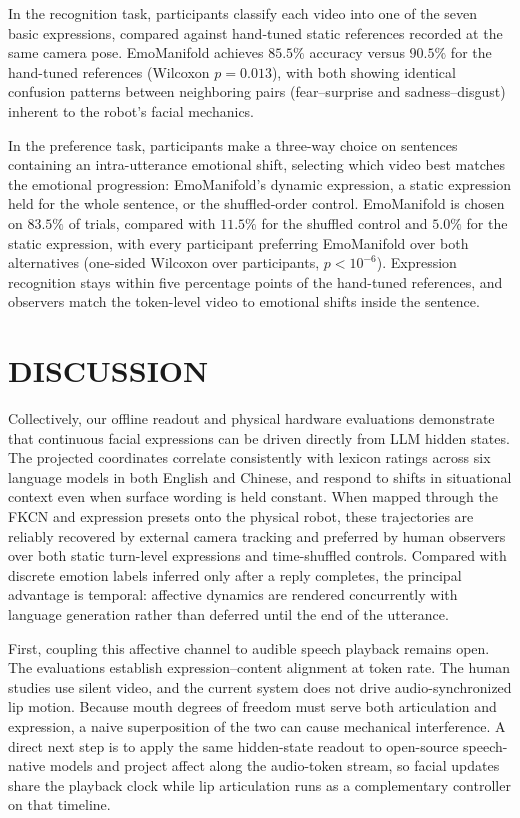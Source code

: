 \documentclass[letterpaper, 10 pt, conference]{ieeeconf/ieeeconf}
\begin{document}
In the recognition task, participants classify each video into one of the seven basic expressions, compared against hand-tuned static references recorded at the same camera pose. EmoManifold achieves $85.5\%$ accuracy versus $90.5\%$ for the hand-tuned references (Wilcoxon $p{=}0.013$), with both showing identical confusion patterns between neighboring pairs (fear--surprise and sadness--disgust) inherent to the robot's facial mechanics.

In the preference task, participants make a three-way choice on sentences containing an intra-utterance emotional shift, selecting which video best matches the emotional progression: EmoManifold's dynamic expression, a static expression held for the whole sentence, or the shuffled-order control. EmoManifold is chosen on $83.5\%$ of trials, compared with $11.5\%$ for the shuffled control and $5.0\%$ for the static expression, with every participant preferring EmoManifold over both alternatives (one-sided Wilcoxon over participants, $p<10^{-6}$). Expression recognition stays within five percentage points of the hand-tuned references, and observers match the token-level video to emotional shifts inside the sentence.

\section{DISCUSSION}
\label{sec:discussion}

Collectively, our offline readout and physical hardware evaluations demonstrate that continuous facial expressions can be driven directly from LLM hidden states. The projected coordinates correlate consistently with lexicon ratings across six language models in both English and Chinese, and respond to shifts in situational context even when surface wording is held constant. When mapped through the FKCN and expression presets onto the physical robot, these trajectories are reliably recovered by external camera tracking and preferred by human observers over both static turn-level expressions and time-shuffled controls. Compared with discrete emotion labels inferred only after a reply completes, the principal advantage is temporal: affective dynamics are rendered concurrently with language generation rather than deferred until the end of the utterance.

First, coupling this affective channel to audible speech playback remains open. The evaluations establish expression--content alignment at token rate. The human studies use silent video, and the current system does not drive audio-synchronized lip motion. Because mouth degrees of freedom must serve both articulation and expression, a naive superposition of the two can cause mechanical interference. A direct next step is to apply the same hidden-state readout to open-source speech-native models and project affect along the audio-token stream, so facial updates share the playback clock while lip articulation runs as a complementary controller on that timeline.
\end{document}
